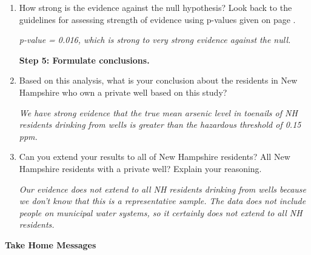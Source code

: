 \begin{enumerate}
\item How strong is the evidence against the null hypothesis?  Look back to
  the guidelines for assessing strength of evidence using p-values
  given on page \pageref{fig:SOE-pvalue}.
\begin{students}
  \vspace{1cm}
\end{students}

\begin{key}
  {\it p-value = 0.016, which is strong to very strong evidence
    against the null.}
\end{key}
 

{\bf Step 5: Formulate conclusions.}


\item Based on this analysis, what is your conclusion about the
  residents in New Hampshire who own a private well based on this
  study?
\begin{students}
  \vspace{2cm}
\end{students}

\begin{key}
  {\it We have strong evidence that the true mean arsenic level in
    toenails of NH residents drinking from wells is greater than the
    hazardous threshold of 0.15 ppm.} 
\end{key}
\item Can you extend your results to all of New Hampshire residents?
  All New Hampshire residents with a private well?  Explain your
  reasoning.
\begin{students}
  \vspace{4cm}
\end{students}

\begin{key}
  {\it Our evidence does not extend to all NH residents drinking from
    wells because we don't know that this is a representative sample.
   The data does not include people on municipal water systems, so it
   certainly does not extend to all NH residents.} 
\end{key}

\end{enumerate}

\begin{center}
  {\bf Take Home Messages}\vspace{-.1in}
\end{center}

